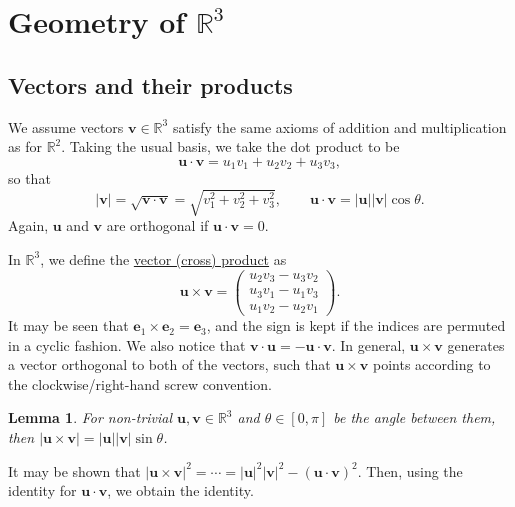\documentclass[10pt,notitlepage]{revtex4-1}
\newtheorem{lemma}[theorem]{Lemma}
\newenvironment{proof}[1][Proof]{\begin{trivlist}
\item[\hskip \labelsep {\bfseries #1}]}{\end{trivlist}}
\newcommand{\eb}{\boldsymbol{e}}
\newcommand{\ub}{\boldsymbol{u}}
\newcommand{\vb}{\boldsymbol{v}}
\begin{document}

\section{Geometry of $\mathbb{R}^3$}


\subsection{Vectors and their products}

We assume vectors $\vb\in\mathbb{R}^3$ satisfy the same axioms of addition and
multiplication as for $\mathbb{R}^2$. Taking the usual basis, we take the dot
product to be
\begin{equation}
	\ub\cdot\vb=u_1 v_1 + u_2 v_2 + u_3 v_3,
\end{equation}
so that
\begin{equation}
	|\vb|=\sqrt{\vb\cdot\vb}=\sqrt{v_1^2 + v_2^2 + v_3^2},\qquad
	\ub\cdot\vb=|\ub||\vb|\cos\theta.
\end{equation}
Again, $\ub$ and $\vb$ are orthogonal if $\ub\cdot\vb=0$.

In $\mathbb{R}^3$, we define the \underline{vector (cross) product} as
\begin{equation}
	\ub\times\vb=\begin{pmatrix}u_2 v_3 -u_3 v_2\\ u_3 v_1 - u_1 v_3\\
	u_1 v_2 - u_2 v_1\end{pmatrix}.
\end{equation}
It may be seen that $\eb_1\times\eb_2=\eb_3$, and the sign is kept if the
indices are permuted in a cyclic fashion. We also notice that
$\vb\cdot\ub=-\ub\cdot\vb$. In general, $\ub\times\vb$ generates a vector
orthogonal to both of the vectors, such that $\ub\times\vb$ points according to
the clockwise/right-hand screw convention.

\begin{lemma}
	For non-trivial $\ub,\vb\in\mathbb{R}^3$ and $\theta\in[0,\pi]$ be the angle
	between them, then $|\ub\times\vb|=|\ub||\vb|\sin\theta$.
\end{lemma}
\begin{proof}
	It may be shown that $|\ub\times\vb|^2=
	\cdots=|\ub|^2|\vb|^2-(\ub\cdot\vb)^2$. Then, using the identity for
	$\ub\cdot\vb$, we obtain the identity.
\end{proof}
\end{document}
